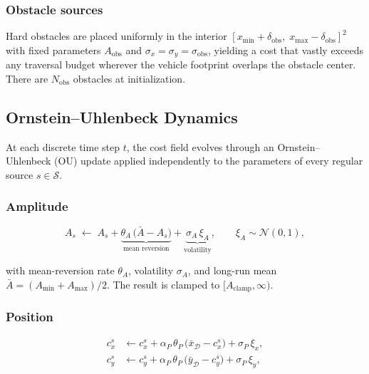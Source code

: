\documentclass[11pt,a4paper]{article}
\begin{document}
\subsubsection*{Obstacle sources}

Hard obstacles are placed uniformly in the interior
$[x_{\min} + \delta_{\mathrm{obs}},\; x_{\max} - \delta_{\mathrm{obs}}]^2$
with fixed parameters $A_{\mathrm{obs}}$ and
$\sigma_x = \sigma_y = \sigma_{\mathrm{obs}}$, yielding a cost that vastly
exceeds any traversal budget wherever the vehicle footprint overlaps the
obstacle center.
There are $N_{\mathrm{obs}}$ obstacles at initialization.

\subsection{Ornstein--Uhlenbeck Dynamics}

At each discrete time step $t$, the cost field evolves through an
Ornstein--Uhlenbeck (OU) update applied independently to the parameters of
every regular source $s \in \mathcal{S}$.

\subsubsection*{Amplitude}

\begin{equation}
  \label{eq:ou_amplitude}
  A_s \;\leftarrow\; A_s
    + \underbrace{\theta_A \,\bigl(\bar{A} - A_s\bigr)}_{\text{mean reversion}}
    + \underbrace{\sigma_A \,\xi_A}_{\text{volatility}},
  \qquad
  \xi_A \sim \mathcal{N}(0,1),
\end{equation}

with mean-reversion rate $\theta_A$, volatility $\sigma_A$, and
long-run mean $\bar{A} = (A_{\min} + A_{\max})/2$.
The result is clamped to $[A_{\mathrm{clamp}}, \infty)$.

\subsubsection*{Position}

\begin{align}
  c_x^s &\leftarrow c_x^s
    + \alpha_P\,\theta_P\,\bigl(\bar{x}_{\mathcal{D}} - c_x^s\bigr)
    + \sigma_P\,\xi_x, \\
  c_y^s &\leftarrow c_y^s
    + \alpha_P\,\theta_P\,\bigl(\bar{y}_{\mathcal{D}} - c_y^s\bigr)
    + \sigma_P\,\xi_y,
\end{align}
\end{document}
